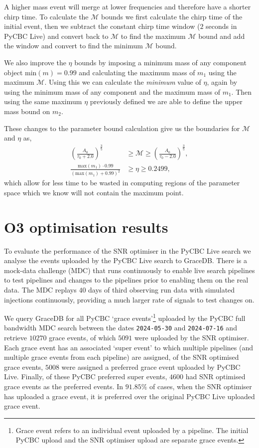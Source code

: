 A higher mass \gwadj event will merge at lower frequencies and therefore have a shorter chirp time. To calculate the $\mathcal{M}$ bounds we first calculate the chirp time of the initial event, then we subtract the constant chirp time window ($2$ seconds in PyCBC Live) and convert back to $\mathcal{M}$ to find the maximum $\mathcal{M}$ bound and add the window and convert to find the minimum $\mathcal{M}$ bound.

We also improve the $\eta$ bounds by imposing a minimum mass of any component object $\text{min}(m) = 0.99$ and calculating the maximum mass of $m_{1}$ using the maximum $\mathcal{M}$. Using this we can calculate the \textit{minimum} value of $\eta$, again by using the minimum mass of any component and the maximum mass of $m_{1}$. Then using the same maximum $\eta$ previously defined we are able to define the upper mass bound on $m_{2}$.

These changes to the parameter bound calculation give us the boundaries for $\mathcal{M}$ and $\eta$ as,
%
\begin{align}
    \left(\frac{A_{0}}{\tau_{0} + 2.0}\right)^{\frac{3}{5}} &\ge \mathcal{M} \ge \left(\frac{A_{0}}{\tau_{0} - 2.0}\right)^{\frac{3}{5}}, \\[10pt]
    \frac{\text{max}(m_{1}) \cdot 0.99}{(\text{max}(m_{1}) + 0.99)^{2}} &\ge \eta \ge 0.2499,
\end{align}
%
which allow for less time to be wasted in computing regions of the parameter space which we know will not contain the maximum point.

\section{\label{7:sec:results}O3 optimisation results}

To evaluate the performance of the SNR optimiser in the PyCBC Live search we analyse the events uploaded by the PyCBC Live search to GraceDB. There is a \gwadj mock-data challenge (MDC) that runs continuously to enable live search pipelines to test pipelines and changes to the pipelines prior to enabling them on the real \gwadj data. The MDC replays $40$ days of third observing run \gwadj data with simulated injections continuously, providing a much larger rate of signals to test changes on.

We query GraceDB for all PyCBC `grace events'\footnote{Grace event refers to an individual event uploaded by a pipeline. The initial PyCBC upload and the SNR optimiser upload are separate grace events.} uploaded by the PyCBC full bandwidth MDC search between the dates \texttt{2024-05-30} and \texttt{2024-07-16} and retrieve $10270$ grace events, of which $5091$ were uploaded by the SNR optimiser. Each grace event has an associated `super event' to which multiple pipelines (and multiple grace events from each pipeline) are assigned, of the SNR optimised grace events, $5008$ were assigned a preferred grace event uploaded by PyCBC Live. Finally, of these PyCBC preferred super events, $4600$ had SNR optimised grace events as the preferred events. In $91.85\%$ of cases, when the SNR optimiser has uploaded a grace event, it is preferred over the original PyCBC Live uploaded grace event.

